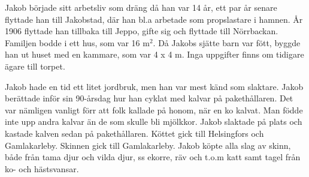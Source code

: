 Jakob började sitt arbetsliv som dräng då han var 14 år, ett par år senare flyttade han till Jakobstad, där han bl.a arbetade som propslastare i hamnen. År 1906 flyttade han tillbaka till Jeppo, gifte sig och flyttade till Nörrbackan. Familjen bodde i ett hus, som var 16 m$^2$. Då Jakobs sjätte barn var fött, byggde han ut huset med en kammare, som var 4 x 4 m. Inga uppgifter finns om tidigare ägare till torpet.
\begin{jhchildren}
  \item {}
  \item {}
  \item {}
  \item {}
  \item {}
  \item {}
  \item {}
  \item {}
  \item {}
  \item {}
  \item {}
  \item {}
  \item {}
  \item {}
  \item {}
\end{jhchildren}
Jakob hade en tid ett litet jordbruk, men han var mest känd som slaktare. Jakob berättade inför sin 90-årsdag hur han cyklat med kalvar på pakethållaren. Det var nämligen vanligt förr att folk kallade på honom, när en ko kalvat. Man födde inte upp andra kalvar än de som skulle bli mjölkkor. Jakob slaktade på plats och kastade kalven sedan på pakethållaren. Köttet gick till Helsingfors och Gamlakarleby. Skinnen gick till Gamlakarleby. Jakob köpte alla slag av skinn, både från tama djur och vilda djur, ss ekorre, räv och t.o.m katt samt tagel från ko- och hästsvansar.

